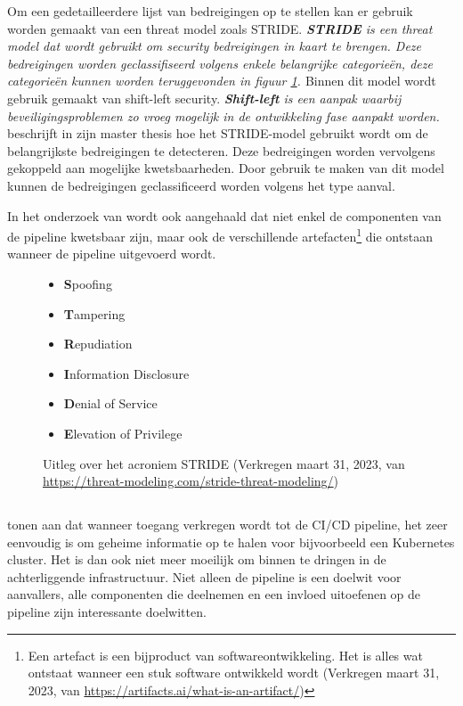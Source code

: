 Om een gedetailleerdere lijst van bedreigingen op te stellen kan er gebruik worden gemaakt van een threat model zoals STRIDE. \textit{\textbf{STRIDE} is een threat model dat wordt gebruikt om security bedreigingen in kaart te brengen. Deze bedreigingen worden geclassifiseerd volgens enkele belangrijke categorieën, deze categorieën kunnen worden teruggevonden in figuur \ref{fig:acronymSTRIDE}. \autocite{VanLanduyt2021}} Binnen dit model wordt gebruik gemaakt van shift-left security. \textit{\textbf{Shift-left} is een aanpak waarbij beveiligingsproblemen zo vroeg mogelijk in de ontwikkeling fase aanpakt worden. \autocite{Kantor2021}} \textcite{Paule2018} beschrijft in zijn master thesis hoe het STRIDE-model gebruikt wordt om de belangrijkste bedreigingen te detecteren. Deze bedreigingen worden vervolgens gekoppeld aan mogelijke kwetsbaarheden. Door gebruik te maken van dit model kunnen de bedreigingen geclassificeerd worden volgens het type aanval. 
\newline

In het onderzoek van \textcite{Paule2018} wordt ook aangehaald dat niet enkel de componenten van de pipeline kwetsbaar zijn, maar ook de verschillende artefacten\footnote{Een artefact is een bijproduct van softwareontwikkeling. Het is alles wat ontstaat wanneer een stuk software ontwikkeld wordt (Verkregen maart 31, 2023, van \url{https://artifacts.ai/what-is-an-artifact/})} die ontstaan wanneer de pipeline uitgevoerd wordt.

\begin{figure}[H]
  \centering
  \begin{itemize}
    \setlength\itemsep{0.1em}
    \item\textbf{S}poofing
    \item\textbf{T}ampering
    \item\textbf{R}epudiation
    \item\textbf{I}nformation Disclosure
    \item\textbf{D}enial of Service
    \item\textbf{E}levation of Privilege
    \caption{\label{fig:acronymSTRIDE}Uitleg over het acroniem STRIDE (Verkregen maart 31, 2023, van \url{https://threat-modeling.com/stride-threat-modeling/})}
  \end{itemize}
\end{figure}

\subsection{}
\label{sec:Aanvallen binnenin een pipeline}
\textcite{Pecka2022} tonen aan dat wanneer toegang verkregen wordt tot de CI/CD pipeline, het zeer eenvoudig is om geheime informatie op te halen voor bijvoorbeeld een Kubernetes cluster. Het is dan ook niet meer moeilijk om binnen te dringen in de achterliggende infrastructuur. Niet alleen de pipeline is een doelwit voor aanvallers, alle componenten die deelnemen en een invloed uitoefenen op de pipeline zijn interessante doelwitten.
\newline

